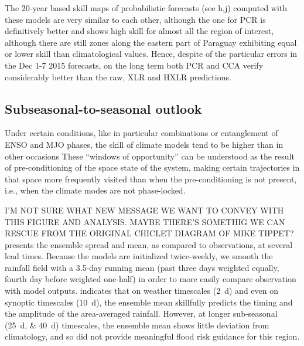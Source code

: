 \documentclass{ametsoc}
\begin{document}
The 20-year based skill maps of probabilistic forecasts (see h,j) computed with these models are very similar to each other, although the one for PCR is definitively better and shows high skill for almost all the region of interest, although there are still zones along the eastern part of Paraguay exhibiting equal or lower skill than climatological values. Hence, despite of the particular errors in the Dec 1-7 2015 forecasts, on the long term both PCR and CCA verify considerably better than the raw, XLR and HXLR predictions.

\subsection{Subseasonal-to-seasonal outlook}
Under certain conditions, like in particular combinations or entanglement of ENSO and MJO phases, the skill of climate models tend to be higher than in other occasions \citep{Vitart2016,Moron2015,Munoz2016} These ``windows of opportunity'' can be understood as the result of pre-conditioning of the space state of the system, making certain trajectories in that space more frequently visited than when the pre-conditioning is not present, i.e., when the climate modes are not phase-locked.


I'M NOT SURE WHAT NEW MESSAGE WE WANT TO CONVEY WITH THIS FIGURE AND ANALYSIS. MAYBE THERE'S SOMETHIG WE CAN RESCUE FROM THE ORIGINAL CHICLET DIAGRAM OF MIKE TIPPET?
 presents the ensemble spread and mean, as compared to observations, at several lead times. Because the models are initialized twice-weekly, we smooth the rainfall field with a 3.5-day running mean (past three days weighted equally, fourth day before weighted one-half) in order to more easily compare observation with model outputs.
 indicates that on weather timescales (\SI{2}{\day}) and even on synoptic timescales (\SI{10}{\day}), the ensemble mean skillfully predicts the timing and the amplitude of the area-averaged rainfall.
However, at longer sub-seasonal (\SIlist{25;40}{\day}) timescales, the ensemble mean shows little deviation from climatology, and so did not provide meaningful flood risk guidance for this region.
\end{document}
